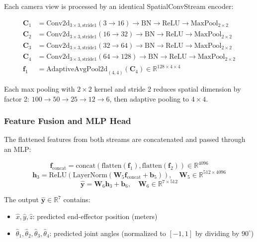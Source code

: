 \documentclass[12pt,a4paper,oneside]{report}
\begin{document}
Each camera view is processed by an identical SpatialConvStream encoder:

\begin{align}
\mathbf{C}_1 &= \text{Conv2d}_{3\times3,\text{stride}1}(3 \rightarrow 16) \rightarrow \text{BN} \rightarrow \text{ReLU} \rightarrow \text{MaxPool}_{2\times2} \\
\mathbf{C}_2 &= \text{Conv2d}_{3\times3,\text{stride}1}(16 \rightarrow 32) \rightarrow \text{BN} \rightarrow \text{ReLU} \rightarrow \text{MaxPool}_{2\times2} \\
\mathbf{C}_3 &= \text{Conv2d}_{3\times3,\text{stride}1}(32 \rightarrow 64) \rightarrow \text{BN} \rightarrow \text{ReLU} \rightarrow \text{MaxPool}_{2\times2} \\
\mathbf{C}_4 &= \text{Conv2d}_{3\times3,\text{stride}1}(64 \rightarrow 128) \rightarrow \text{BN} \rightarrow \text{ReLU} \rightarrow \text{MaxPool}_{2\times2} \\
\mathbf{f}_1 &= \text{AdaptiveAvgPool2d}_{(4,4)}(\mathbf{C}_4) \in \mathbb{R}^{128 \times 4 \times 4}
\end{align}

Each max pooling with $2 \times 2$ kernel and stride 2 reduces spatial dimension by factor 2: $100 \rightarrow 50 \rightarrow 25 \rightarrow 12 \rightarrow 6$, then adaptive pooling to $4 \times 4$.

\subsubsection{Feature Fusion and MLP Head}

The flattened features from both streams are concatenated and passed through an MLP:

\begin{equation}
\mathbf{f}_{\text{concat}} = \text{concat}(\text{flatten}(\mathbf{f}_1), \text{flatten}(\mathbf{f}_2)) \in \mathbb{R}^{4096}
\end{equation}
\begin{equation}
\mathbf{h}_3 = \text{ReLU}(\text{LayerNorm}(\mathbf{W}_5 \mathbf{f}_{\text{concat}} + \mathbf{b}_5)), \quad \mathbf{W}_5 \in \mathbb{R}^{512 \times 4096}
\end{equation}
\begin{equation}
\hat{\mathbf{y}} = \mathbf{W}_6 \mathbf{h}_3 + \mathbf{b}_6, \quad \mathbf{W}_6 \in \mathbb{R}^{7 \times 512}
\end{equation}

The output $\hat{\mathbf{y}} \in \mathbb{R}^7$ contains:
\begin{itemize}
    \item $\hat{x}, \hat{y}, \hat{z}$: predicted end-effector position (meters)
    \item $\hat{\theta}_1, \hat{\theta}_2, \hat{\theta}_3, \hat{\theta}_4$: predicted joint angles (normalized to $[-1, 1]$ by dividing by $90^\circ$)
\end{itemize}
\end{document}
